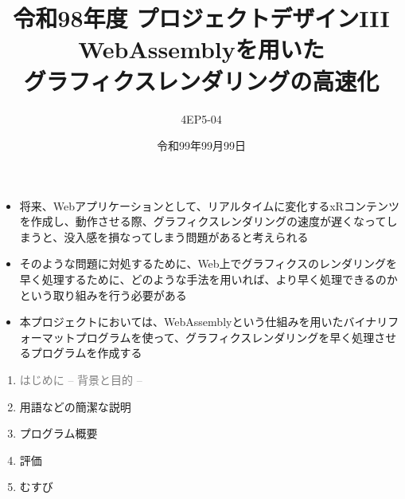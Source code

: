 % 
%

\title{
{\normalsize 令和98年度 プロジェクトデザインIII}\\\vspace{10mm}
{\LARGE WebAssemblyを用いた\\グラフィクスレンダリングの高速化}
}
\date{令和99年99月99日}
\author{
4EP5-04\\ 
}




\maketitle %
\addtocounter{page}{1}
\thispagestyle{myfirstpage}

\begin{itemize}
 \item 将来、Webアプリケーションとして、リアルタイムに変化するxRコンテンツを作成し、動作させる際、グラフィクスレンダリングの速度が遅くなってしまうと、没入感を損なってしまう問題があると考えられる
 \item そのような問題に対処するために、Web上でグラフィクスのレンダリングを早く処理するために、どのような手法を用いれば、より早く処理できるのかという取り組みを行う必要がある
 \item 本プロジェクトにおいては、WebAssemblyという仕組みを用いたバイナリフォーマットプログラムを使って、グラフィクスレンダリングを早く処理させるプログラムを作成する
\end{itemize}
\newpage

\begin{enumerate}[itemsep=0.25\zh]
	\item \textcolor{gray}{はじめに -- 背景と目的 --}
	\item 用語などの簡潔な説明
	\item プログラム概要
	\item 評価
	\item むすび
\end{enumerate}
\newpage

